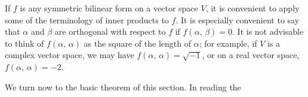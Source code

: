If \(f\) is any symmetric bilinear form on a vector space \(V\), it is convenient to apply some of the terminology of inner products to \(f\). It is especially convenient to say that \(\alpha\) and \(\beta\) are orthogonal with respect to \(f\) if \(f(\alpha,\,\beta)=0\). It is not advisable to think of \(f(\alpha,\,\alpha)\) as the square of the length of \(\alpha\); for example, if \(V\) is a complex vector space, we may have \(f(\alpha,\,\alpha)=\sqrt{-1}\), or on a real vector space, \(f(\alpha,\,\alpha)=-2\).

We turn now to the basic theorem of this section. In reading the 